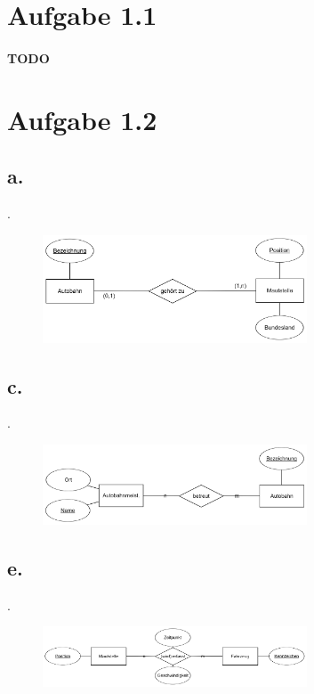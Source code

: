 \documentclass{article}
\begin{document}
	
	
	
	
	\section*{Aufgabe 1.1}
		\paragraph{TODO}
		
	\section*{Aufgabe 1.2}
		\subsection*{a.}
		.
			\begin{figure}[h]
				\includegraphics[width=0.7\textwidth]{aufgabe_1_2_a.png}
			\end{figure}
		
		
		
		\subsection*{c.}
		.
			\begin{figure}[h]
				\includegraphics[width=0.7\textwidth]{aufgabe_1_2_c.png}
			\end{figure}
			
		
		
		
		\subsection*{e.}
		.
			\begin{figure}[h]
				\includegraphics[width=0.7\textwidth]{aufgabe_1_2_e.png}
			\end{figure}
		
\end{document}

